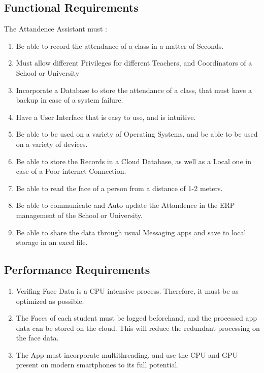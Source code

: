 \documentclass[11pt]{article}
\begin{document}
\subsection{Functional Requirements}
The Attandence Assistant must : 
\begin{enumerate}
    \item Be able to record the attendance of a class in a matter of Seconds.
    \item Must allow different Privileges for different Teachers, and Coordinators of a School or University
    \item Incorporate a Database to store the attendance of a class, that must have a backup in case of a system failure.
    \item Have a User Interface that is easy to use, and is intuitive.
    \item Be able to be used on a variety of Operating Systems, and be able to be used on a variety of devices.
    \item Be able to store the Records in a Cloud Database, as well as a Local one in case of a Poor internet Connection. 
    \item Be able to read the face of a person from a distance of 1-2 meters.
    \item Be able to communicate and Auto update the Attandence in the ERP management of the School or University.
    \item Be able to share the data through usual Messaging apps and save to local storage in an excel file. 
\end{enumerate}
\subsection{Performance Requirements}
\begin{enumerate}
    \item Verifing Face Data is a CPU intensive process. Therefore, it must be as optimized as possible. 
    \item The Faces of each student must be logged beforehand, and the processed app data can be stored on the cloud. This will reduce the redundant processing on the face data. 
    \item The App must incorporate multithreading, and use the CPU and GPU present on modern smartphones to its full potential.
\end{enumerate}
\end{document}
